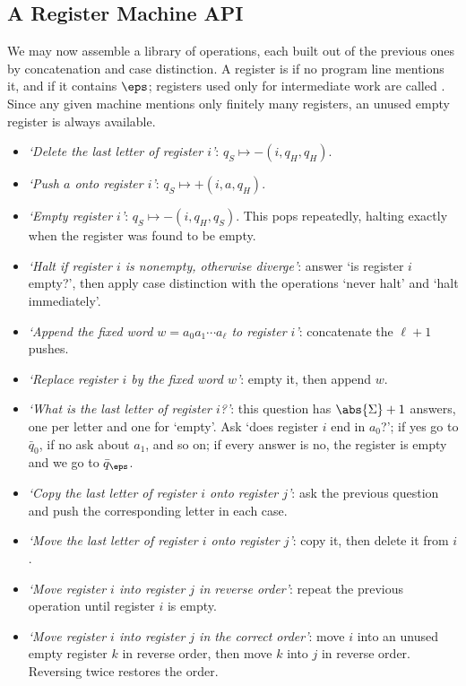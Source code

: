 \subsection{A Register Machine API}\label{sec:api}

We may now assemble a library of operations, each built out of the previous ones by concatenation and case distinction. A register is  if no program line mentions it, and  if it contains $\eps$; registers used only for intermediate work are called . Since any given machine mentions only finitely many registers, an unused empty register is always available.

\begin{itemize}
	\item \emph{`Delete the last letter of register $i$'}: $q_S \mapsto -(i,q_H,q_H)$.
	\item \emph{`Push $a$ onto register $i$'}: $q_S \mapsto +(i,a,q_H)$.
	\item \emph{`Empty register $i$'}: $q_S \mapsto -(i,q_H,q_S)$. This pops repeatedly, halting exactly when the register was found to be empty.
	\item \emph{`Halt if register $i$ is nonempty, otherwise diverge'}: answer `is register $i$ empty?', then apply case distinction with the operations `never halt' and `halt immediately'.
	\item \emph{`Append the fixed word $w = a_0a_1\cdots a_\ell$ to register $i$'}: concatenate the $\ell+1$ pushes.
	\item \emph{`Replace register $i$ by the fixed word $w$'}: empty it, then append $w$.
	\item \emph{`What is the last letter of register $i$?'}: this question has $\abs{\Sigma}+1$ answers, one per letter and one for `empty'. Ask `does register $i$ end in $a_0$?'; if yes go to $\bar q_0$, if no ask about $a_1$, and so on; if every answer is no, the register is empty and we go to $\bar q_\eps$.
	\item \emph{`Copy the last letter of register $i$ onto register $j$'}: ask the previous question and push the corresponding letter in each case.
	\item \emph{`Move the last letter of register $i$ onto register $j$'}: copy it, then delete it from $i$.
	\item \emph{`Move register $i$ into register $j$ in reverse order'}: repeat the previous operation until register $i$ is empty.
	\item \emph{`Move register $i$ into register $j$ in the correct order'}: move $i$ into an unused empty register $k$ in reverse order, then move $k$ into $j$ in reverse order. Reversing twice restores the order.

\end{itemize}
